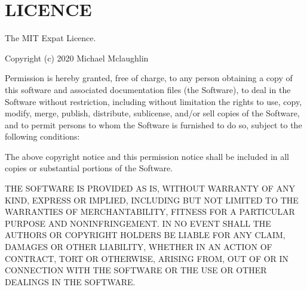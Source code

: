 \chapter{LICENCE }
\hypertarget{md__c_1_2_users_2saket_2_one_drive_2_desktop_2e_pathshala_2epathshala-_web_2node__modules_2decimal_8js-light_2_l_i_c_e_n_c_e}{}\label{md__c_1_2_users_2saket_2_one_drive_2_desktop_2e_pathshala_2epathshala-_web_2node__modules_2decimal_8js-light_2_l_i_c_e_n_c_e}
The MIT Expat Licence.

Copyright (c) 2020 Michael Mclaughlin

Permission is hereby granted, free of charge, to any person obtaining a copy of this software and associated documentation files (the \textquotesingle{}Software\textquotesingle{}), to deal in the Software without restriction, including without limitation the rights to use, copy, modify, merge, publish, distribute, sublicense, and/or sell copies of the Software, and to permit persons to whom the Software is furnished to do so, subject to the following conditions\+:

The above copyright notice and this permission notice shall be included in all copies or substantial portions of the Software.

THE SOFTWARE IS PROVIDED \textquotesingle{}AS IS\textquotesingle{}, WITHOUT WARRANTY OF ANY KIND, EXPRESS OR IMPLIED, INCLUDING BUT NOT LIMITED TO THE WARRANTIES OF MERCHANTABILITY, FITNESS FOR A PARTICULAR PURPOSE AND NONINFRINGEMENT. IN NO EVENT SHALL THE AUTHORS OR COPYRIGHT HOLDERS BE LIABLE FOR ANY CLAIM, DAMAGES OR OTHER LIABILITY, WHETHER IN AN ACTION OF CONTRACT, TORT OR OTHERWISE, ARISING FROM, OUT OF OR IN CONNECTION WITH THE SOFTWARE OR THE USE OR OTHER DEALINGS IN THE SOFTWARE. 